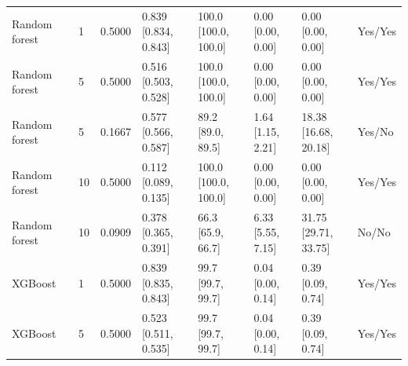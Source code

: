 \begin{longtable}{llllllll}
Random forest & 1 & 0.5000 & \shortstack{{0.839} \\ {[0.834, 0.843]}} & \shortstack{{100.0} \\ {[100.0, 100.0]}} & \shortstack{{0.00} \\ {[0.00, 0.00]}} & \shortstack{{0.00} \\ {[0.00, 0.00]}} & Yes/Yes \\
Random forest & 5 & 0.5000 & \shortstack{{0.516} \\ {[0.503, 0.528]}} & \shortstack{{100.0} \\ {[100.0, 100.0]}} & \shortstack{{0.00} \\ {[0.00, 0.00]}} & \shortstack{{0.00} \\ {[0.00, 0.00]}} & Yes/Yes \\
Random forest & 5 & 0.1667 & \shortstack{{0.577} \\ {[0.566, 0.587]}} & \shortstack{{89.2} \\ {[89.0, 89.5]}} & \shortstack{{1.64} \\ {[1.15, 2.21]}} & \shortstack{{18.38} \\ {[16.68, 20.18]}} & Yes/No \\
Random forest & 10 & 0.5000 & \shortstack{{0.112} \\ {[0.089, 0.135]}} & \shortstack{{100.0} \\ {[100.0, 100.0]}} & \shortstack{{0.00} \\ {[0.00, 0.00]}} & \shortstack{{0.00} \\ {[0.00, 0.00]}} & Yes/Yes \\
Random forest & 10 & 0.0909 & \shortstack{{0.378} \\ {[0.365, 0.391]}} & \shortstack{{66.3} \\ {[65.9, 66.7]}} & \shortstack{{6.33} \\ {[5.55, 7.15]}} & \shortstack{{31.75} \\ {[29.71, 33.75]}} & No/No \\
XGBoost & 1 & 0.5000 & \shortstack{{0.839} \\ {[0.835, 0.843]}} & \shortstack{{99.7} \\ {[99.7, 99.7]}} & \shortstack{{0.04} \\ {[0.00, 0.14]}} & \shortstack{{0.39} \\ {[0.09, 0.74]}} & Yes/Yes \\
XGBoost & 5 & 0.5000 & \shortstack{{0.523} \\ {[0.511, 0.535]}} & \shortstack{{99.7} \\ {[99.7, 99.7]}} & \shortstack{{0.04} \\ {[0.00, 0.14]}} & \shortstack{{0.39} \\ {[0.09, 0.74]}} & Yes/Yes \\

\end{longtable}
